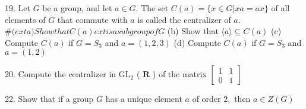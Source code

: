 \begin{mdframed}[style=darkAnswer,frametitle={Joe Starr}]

\end{mdframed}
\newpage
\begin{mdframed}[style=darkQuesion]
19. Let $G$ be a group, and let $a \in G .$ The set $C(a)=\{x \in G | x a=a x\}$ of all elements of $G$ that commute with $a$ is called the centralizer of $a .$
$\#(  ext { a ) Show that } C(a)   ext { is a subgroup of } G$
(b) Show that $\langle a\rangle \subseteq C(a)$
(c) Compute $C(a)$ if $G=S_{3}$ and $a=(1,2,3)$
(d) Compute $C(a)$ if $G=S_{3}$ and $a=(1,2)$

\end{mdframed}

\begin{mdframed}[style=darkAnswer,frametitle={Joe Starr}]

\end{mdframed}
\newpage
\begin{mdframed}[style=darkQuesion]
20. Compute the centralizer in $\mathrm{GL}_{2}$ ( $\mathbf{R}$ ) of the matrix $\left[\begin{array}{ll}1 & 1 \\ 0 & 1\end{array}\right]$

\end{mdframed}

\begin{mdframed}[style=darkAnswer,frametitle={Joe Starr}]

\end{mdframed}
\newpage
\begin{mdframed}[style=darkQuesion]
22. Show that if a group $G$ has a unique element $a$ of order $2,$ then $a \in Z(G)$

\end{mdframed}


